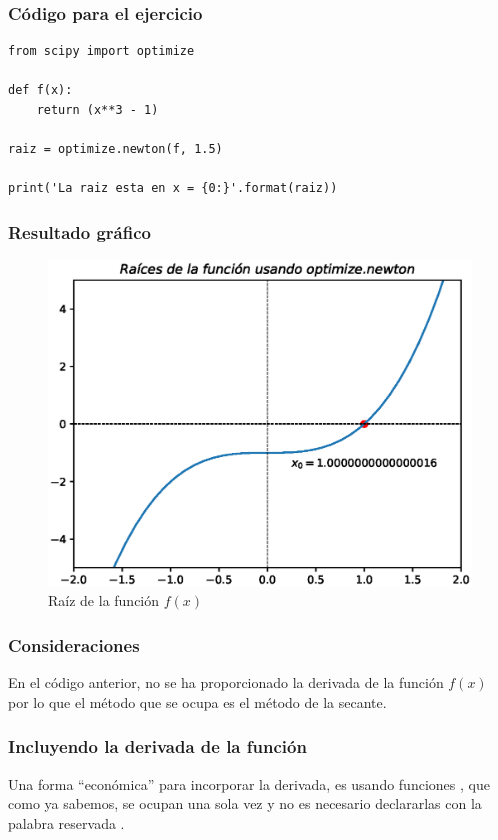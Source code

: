 \begin{frame}
\frametitle{Código para el ejercicio}
\begin{lstlisting}[caption=Código que usa \texttt{optimize.newton} pero sin la derivada de la función, style=codigopython]
from scipy import optimize

def f(x):
    return (x**3 - 1)

raiz = optimize.newton(f, 1.5)

print('La raiz esta en x = {0:}'.format(raiz))
\end{lstlisting}
\end{frame}
\begin{frame}
\frametitle{Resultado gráfico}
\begin{figure}[h!]
    \centering
    \includegraphics[scale=0.5]{Imagenes/raices_scipy_newton_02.eps}
    \caption{Raíz de la función $f(x)$}
\end{figure}
\end{frame}
\begin{frame}
\frametitle{Consideraciones}
En el código anterior, no se ha proporcionado la derivada de la función $f(x)$ por lo que el método que se ocupa es el método de la secante.
\end{frame}
\begin{frame}
\frametitle{Incluyendo la derivada de la función}
Una forma \enquote{económica} para incorporar la derivada, es usando funciones , que como ya sabemos, se ocupan una sola vez y no es necesario declararlas con la palabra reservada .
\end{frame}
